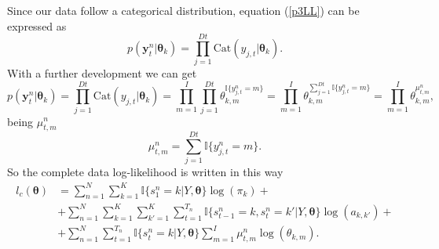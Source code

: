 \documentclass[12pt]{article}
\newcommand{\indicator}{\mathbb{I}}
\begin{document}
\noindent Since our data follow a categorical distribution, equation (\ref{p3LL}) can be expressed as
\begin{equation}
p \left( \mathbf { y } _ { t } ^ { n } | \boldsymbol\theta_{k} \right) = \prod\limits_{j=1}^{Dt} \text{Cat}(y_{j,t}|\boldsymbol\theta_{k}).
\end{equation}
With a further development we can get
\begin{equation}
p \left( \mathbf { y } _ { t } ^ { n } | \boldsymbol\theta_{k} \right) = \prod\limits_{j=1}^{Dt} \text{Cat}(y_{j,t}|\boldsymbol\theta_{k}) = \prod\limits_{m=1}^{I}\prod\limits_{j=1}^{Dt}\theta_{k,m}^{\indicator\lbrace{y_{j,t}^{n}=m}\rbrace} = \prod\limits_{m=1}^{I}\theta_{k,m}^{\sum\limits_{j=1}^{Dt}\indicator\lbrace{y_{j,t}^{n}=m}\rbrace} = \prod\limits_{m=1}^{I}\theta_{k,m}^{\mu^{n}_{t,m}},
\end{equation}
being $\mu^{n}_{t,m}$
\begin{equation}
\mu^{n}_{t,m} = \sum\limits_{j=1}^{Dt}\indicator\lbrace{y_{j,t}^{n}=m}\rbrace.
\end{equation}
So the complete data log-likelihood is written in this way
\begin{equation}
\begin{split}
l_{c}\left(\boldsymbol\theta\right) &= \sum\limits_{n=1}^{N}\sum\limits_{k=1}^{K}\indicator \lbrace s_{1}^{n}=k|Y,\boldsymbol\theta\rbrace \log(\pi_{k}) + \\
&+ \sum\limits_{n=1}^{N}\sum\limits_{k=1}^{K}\sum\limits_{k'=1}^{K}\sum\limits_{t=1}^{T_{n}}\indicator \lbrace s_{t-1}^{n}=k,s_{t}^{n}=k'|Y,\boldsymbol\theta\rbrace \log(a_{k,k'}) + \\
&+ \sum\limits_{n=1}^{N}\sum\limits_{t=1}^{T_{n}}  \indicator \lbrace s_{t}^{n}=k|Y,\boldsymbol\theta\rbrace    \sum\limits_{m=1}^{I}\mu^{n}_{t,m} \log(\theta_{k,m}).
\end{split}
\end{equation}
\end{document}
